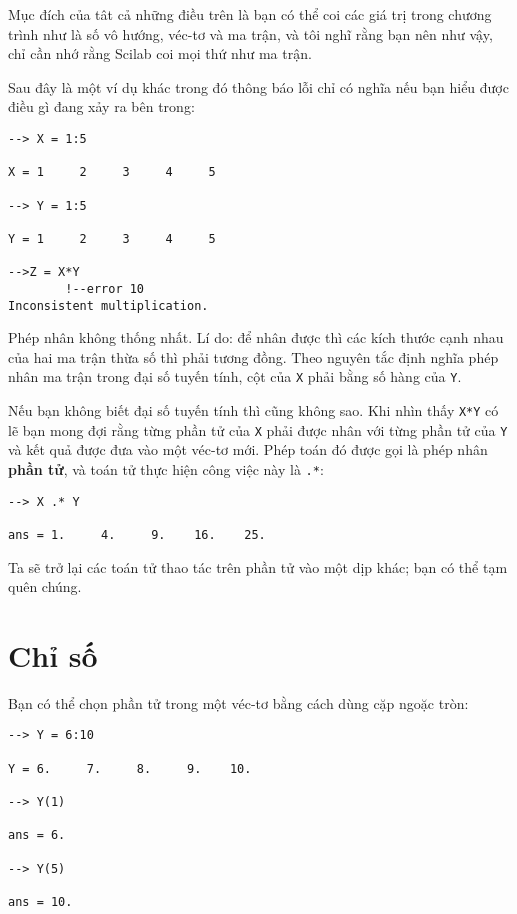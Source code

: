 \documentclass[12pt]{book}
\begin{document}
Mục đích của tât cả những điều trên là bạn có thể coi các 
giá trị trong chương trình như là số vô hướng, véc-tơ và ma trận,
và tôi nghĩ rằng bạn nên như vậy, chỉ cần nhớ rằng Scilab
coi mọi thứ như ma trận.

Sau đây là một ví dụ khác trong đó thông báo lỗi chỉ có nghĩa
nếu bạn hiểu được điều gì đang xảy ra bên trong:

\begin{verbatim}
--> X = 1:5

X = 1     2     3     4     5

--> Y = 1:5

Y = 1     2     3     4     5

-->Z = X*Y
        !--error 10 
Inconsistent multiplication.
\end{verbatim}

Phép nhân không thống nhất.
Lí do: để nhân được thì các kích thước cạnh nhau của hai ma trận
thừa số thì phải tương đồng. Theo nguyên tắc định nghĩa phép nhân ma trận
trong đại số tuyến tính, cột của {\tt X} phải bằng số hàng
của {\tt Y}.

Nếu bạn không biết đại số tuyến tính thì cũng không sao. Khi 
nhìn thấy {\tt X*Y} có lẽ bạn mong đợi rằng từng phần tử của
{\tt X} phải được nhân với từng phần tử của 
{\tt Y} và kết quả được đưa vào một véc-tơ mới. Phép toán đó
được gọi là phép nhân {\bf phần tử}, và toán tử thực hiện
công việc này là {\tt .*}:

\begin{verbatim}
--> X .* Y

ans = 1.     4.     9.    16.    25.
\end{verbatim}

Ta sẽ trở lại các toán tử thao tác trên phần tử vào một dịp
khác; bạn có thể tạm quên chúng.




\section{Chỉ số}

Bạn có thể chọn phần tử trong một véc-tơ bằng cách dùng
cặp ngoặc tròn:

\begin{verbatim}
--> Y = 6:10

Y = 6.     7.     8.     9.    10.

--> Y(1)

ans = 6.

--> Y(5)

ans = 10.
\end{verbatim}
\end{document}
